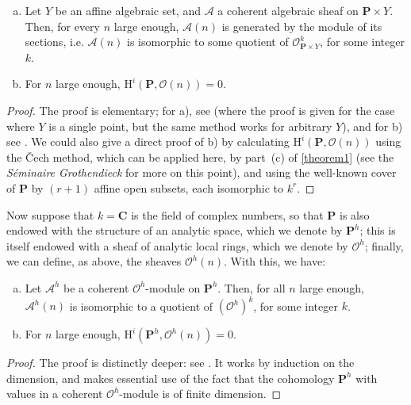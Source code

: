 \documentclass{article}
\theoremstyle{plain}
\newenvironment{theorem}[1]
    {\renewcommand\theinnercustomtheorem{#1}\innercustomtheorem}
    {\endinnercustomtheorem}
\newenvironment{corollary}[1]
    {\renewcommand\theinnercustomcorollary{#1}\innercustomcorollary}
    {\endinnercustomcorollary}
\theoremstyle{definition}
\newcommand{\sh}{\mathscr}
\newcommand{\HH}{\mathrm{H}}
\newcommand{\oldpage}[1]{\marginpar{\footnotesize$\Big\vert$ \textit{p.~#1}}}
\begin{document}
\begin{theorem}{3}
\label{theorem3}
\begin{enumerate}[(a)]
  \item Let $Y$ be an affine algebraic set, and $\sh{A}$ a coherent algebraic sheaf on $\mathbf{P}\times Y$.
    Then, for every $n$ large enough, $\sh{A}(n)$ is generated by the module of its sections, i.e. $\sh{A}(n)$ is isomorphic to some quotient of $\sh{O}_{\mathbf{P}\times Y}^k$, for some integer $k$.
  \item For $n$ large enough, $\HH^i(\mathbf{P},\sh{O}(n))=0$.
\end{enumerate}
\end{theorem}

\begin{proof}
  The proof is elementary; for a), see \cite[page~247, th\'{e}or\`{e}me~1]{1} (where the proof is given for the case where $Y$ is a single point, but the same method works for arbitrary $Y$), and for b) see \cite[page~259, th\'{e}or\`{e}me~2]{1}.
  We could also give a direct proof of b) by calculating $\HH^i(\mathbf{P},\sh{O}(n))$ using the \v{C}ech method, which can be applied here, by part~(c) of \cref{theorem1} (see the \emph{S\'{e}minaire Grothendieck} for more on this point), and using the well-known cover of $\mathbf{P}$ by $(r+1)$ affine open subsets, each isomorphic to $k^r$.
\end{proof}

Now suppose that $k=\mathbf{C}$ is the field of complex numbers, so that $\mathbf{P}$ is also endowed with the structure of an analytic space, which we denote by $\mathbf{P}^h$;
this is itself endowed with a sheaf of analytic local rings, which we denote by $\sh{O}^h$;
finally, we can define, as above, the sheaves $\sh{O}^h(n)$.
With this, we have:

\begin{corollary}{\!\!}
\label{corollary-3}
  \oldpage{2-07}
  \begin{enumerate}[(a)]
    \item Let $\sh{A}^h$ be a coherent $\sh{O}^h$-module on $\mathbf{P}^h$.
      Then, for all $n$ large enough, $\sh{A}^h(n)$ is isomorphic to a quotient of $(\sh{O}^h)^k$, for some integer $k$.
    \item For $n$ large enough, $\HH^i(\mathbf{P}^h,\sh{O}^h(n))=0$.
  \end{enumerate}
\end{corollary}

\begin{proof}
  The proof is distinctly deeper: see \cite[lemme~5, page~12, and lemma~8, page~24]{2}.
  It works by induction on the dimension, and makes essential use of the fact that the cohomology $\mathbf{P}^h$ with values in a coherent $\sh{O}^h$-module is of finite dimension.
\end{proof}
\end{document}
